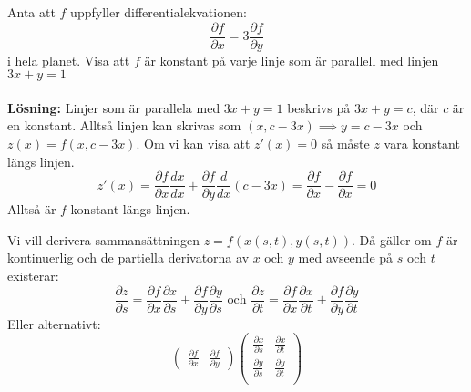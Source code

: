 \documentclass{report}
\begin{document}
\vspace{20pt}

\ex{}
{
Anta att $ f $ uppfyller differentialekvationen:
\begin{equation*}
\frac{\partial f }{\partial x } = 3 \frac{\partial f }{\partial y } 
\end{equation*}
i hela planet. Visa att $ f $ är konstant på varje linje som är parallell med linjen $ 3x+y = 1 $\\\\

\textbf{Lösning:} Linjer som är parallela med $ 3x+y = 1 $ beskrivs på $ 3x+y = c $, där $ c $ är en konstant. Alltså linjen kan skrivas som $ (x, c-3x) \implies y = c-3x $ och $ z(x) = f(x,c-3x) $. Om vi kan visa att $ z'(x) = 0 $ så måste $ z $ vara konstant längs linjen.
\begin{equation*}
z'(x) = \frac{\partial f }{\partial x } \frac{dx}{dx} + \frac{\partial f }{\partial y } \frac{d}{dx} (c-3x) = \frac{\partial f }{\partial x } - \frac{\partial f }{\partial x } = 0 
\end{equation*}
Alltså är $ f $ konstant längs linjen. 
}

{
Vi vill derivera sammansättningen $ z = f(x(s,t),y(s,t)) $. Då gäller om $ f $ är kontinuerlig och de partiella derivatorna av $ x $ och $ y $ med avseende på $ s $ och $ t $ existerar:
\begin{equation*}
\frac{\partial z }{\partial s } = \frac{\partial f }{\partial x } \frac{\partial x }{\partial s } + \frac{\partial f }{\partial y } \frac{\partial y }{\partial s } \text{ och } \frac{\partial z }{\partial t } = \frac{\partial f }{\partial x } \frac{\partial x }{\partial t } + \frac{\partial f }{\partial y } \frac{\partial y }{\partial t } 
\end{equation*}
Eller alternativt:
\begin{equation*}
\begin{pmatrix}
	\frac{\partial f }{\partial x }  & \frac{\partial f }{\partial y } 
\end{pmatrix}
\begin{pmatrix}
	\frac{\partial x }{\partial s }  & \frac{\partial x }{\partial t }  \\
	\frac{\partial y }{\partial s }  & \frac{\partial y }{\partial t }  \\
\end{pmatrix}
\end{equation*}
}
\pagebreak
\end{document}
